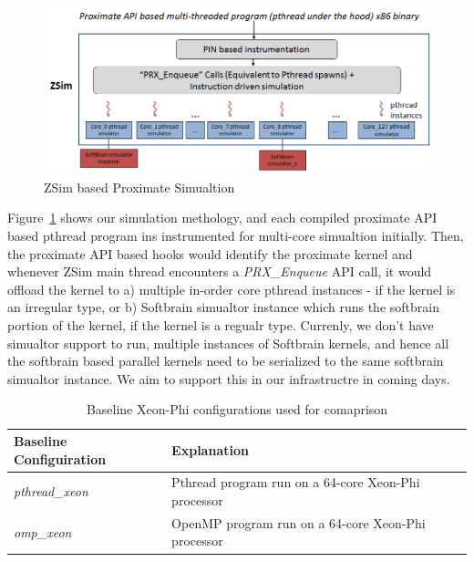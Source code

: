 \begin{figure}
  \begin{center}
    \includegraphics[width=\linewidth]{cs758-figs/zsim-meth.png}
  \end{center}
\vspace{-0.2in}
  \caption{ZSim based Proximate Simualtion}
  \label{fig:sim}
\vspace{-0.05in}
\end{figure}

Figure~\ref{fig:sim} shows our simulation methology, and  each compiled
proximate API based pthread program ins instrumented for multi-core simualtion initially.
Then, the proximate API based hooks would identify the proximate kernel and whenever ZSim main thread
encounters a \emph{PRX\_Enqueue} API call, it would offload the kernel to 
a) multiple in-order core pthread instances - if the kernel is an irregular type,  or b) Softbrain simualtor instance
which runs the softbrain portion of the kernel, if the kernel is a regualr type. 
Currenly, we don't have simualtor support to run, multiple instances of Softbrain kernels, 
and hence all the softbrain based parallel kernels need to be serialized to the same softbrain
simualtor instance. We aim to support this in our infrastructre in coming days. 


\begin{table}[]
  \centering
  \begin{tabular}{|l|l|}
    \hline
    \textbf{Baseline Configuiration} & \textbf{Explanation}                                \\ \hline
    \textit{pthread\_xeon}  & Pthread program run on a 64-core Xeon-Phi processor \\ \hline
    \textit{omp\_xeon}      & OpenMP program run on a 64-core Xeon-Phi processor  \\ \hline
  \end{tabular}
  \caption{Baseline Xeon-Phi configurations used for comaprison}
  \label{tab:base-config}
\end{table}

